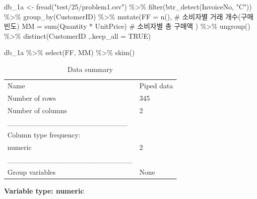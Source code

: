 \documentclass[
  letterpaper,
  DIV=11,
  numbers=noendperiod]{scrreprt}
\newenvironment{Shaded}{\begin{snugshade}}{\end{snugshade}}
\newcommand{\AttributeTok}[1]{\textcolor[rgb]{0.40,0.45,0.13}{#1}}
\newcommand{\CommentTok}[1]{\textcolor[rgb]{0.37,0.37,0.37}{#1}}
\newcommand{\ConstantTok}[1]{\textcolor[rgb]{0.56,0.35,0.01}{#1}}
\newcommand{\FunctionTok}[1]{\textcolor[rgb]{0.28,0.35,0.67}{#1}}
\newcommand{\NormalTok}[1]{\textcolor[rgb]{0.00,0.23,0.31}{#1}}
\newcommand{\OtherTok}[1]{\textcolor[rgb]{0.00,0.23,0.31}{#1}}
\newcommand{\SpecialCharTok}[1]{\textcolor[rgb]{0.37,0.37,0.37}{#1}}
\newcommand{\StringTok}[1]{\textcolor[rgb]{0.13,0.47,0.30}{#1}}
\begin{document}
\begin{Shaded}
\begin{Highlighting}[]
\NormalTok{db\_1a }\OtherTok{\textless{}{-}} \FunctionTok{fread}\NormalTok{(}\StringTok{"test/25/problem1.csv"}\NormalTok{) }\SpecialCharTok{\%\textgreater{}\%}
  \FunctionTok{filter}\NormalTok{(}\SpecialCharTok{!}\FunctionTok{str\_detect}\NormalTok{(InvoiceNo, }\StringTok{"C"}\NormalTok{)) }\SpecialCharTok{\%\textgreater{}\%}
  \FunctionTok{group\_by}\NormalTok{(CustomerID) }\SpecialCharTok{\%\textgreater{}\%}
  \FunctionTok{mutate}\NormalTok{(}\AttributeTok{FF =} \FunctionTok{n}\NormalTok{(), }\CommentTok{\# 소비자별 거래 개수(구매빈도)}
         \AttributeTok{MM =} \FunctionTok{sum}\NormalTok{(Quantity }\SpecialCharTok{*}\NormalTok{ UnitPrice) }\CommentTok{\# 소비자별 총 구매액}
\NormalTok{         ) }\SpecialCharTok{\%\textgreater{}\%}
  \FunctionTok{ungroup}\NormalTok{() }\SpecialCharTok{\%\textgreater{}\%} 
  \FunctionTok{distinct}\NormalTok{(CustomerID ,}\AttributeTok{.keep\_all =} \ConstantTok{TRUE}\NormalTok{)}

\NormalTok{db\_1a }\SpecialCharTok{\%\textgreater{}\%}
  \FunctionTok{select}\NormalTok{(FF, MM) }\SpecialCharTok{\%\textgreater{}\%}
  \FunctionTok{skim}\NormalTok{()}
\end{Highlighting}
\end{Shaded}

\begin{longtable}[]{@{}ll@{}}
\caption{Data summary}\tabularnewline
\toprule()
\endhead
Name & Piped data \\
Number of rows & 345 \\
Number of columns & 2 \\
\_\_\_\_\_\_\_\_\_\_\_\_\_\_\_\_\_\_\_\_\_\_\_ & \\
Column type frequency: & \\
numeric & 2 \\
\_\_\_\_\_\_\_\_\_\_\_\_\_\_\_\_\_\_\_\_\_\_\_\_ & \\
Group variables & None \\
\bottomrule()
\end{longtable}

\textbf{Variable type: numeric}
\end{document}
